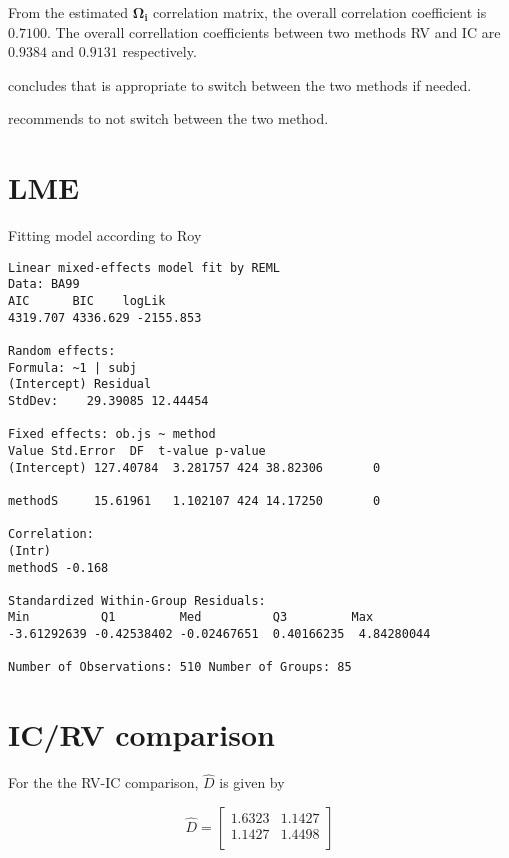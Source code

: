 From the estimated $\boldsymbol{\Omega_{i}}$ correlation matrix, the overall correlation coefficient is $0.7100$.
The overall correllation coefficients between two methods RV and IC are $0.9384$ and $0.9131$ respectively.

\citet{roy} concludes that is appropriate to switch between the two methods if needed.


\citet{haber}

\citet{roy} recommends to not switch between the two method.


\section{LME}

Fitting model according to Roy

\newpage
\begin{verbatim}
Linear mixed-effects model fit by REML
Data: BA99
AIC      BIC    logLik
4319.707 4336.629 -2155.853

Random effects:
Formula: ~1 | subj
(Intercept) Residual
StdDev:    29.39085 12.44454

Fixed effects: ob.js ~ method
Value Std.Error  DF  t-value p-value
(Intercept) 127.40784  3.281757 424 38.82306       0

methodS     15.61961   1.102107 424 14.17250       0

Correlation:
(Intr)
methodS -0.168

Standardized Within-Group Residuals:
Min          Q1         Med          Q3         Max
-3.61292639 -0.42538402 -0.02467651  0.40166235  4.84280044

Number of Observations: 510 Number of Groups: 85

\end{verbatim}

\newpage

\section{IC/RV comparison}



For the the RV-IC comparison, $\hat{D}$ is given by


\begin{equation}
\hat{D}= \left[ \begin{array}{cc}
1.6323 & 1.1427  \\
1.1427 & 1.4498 \\
\end{array} \right]
\end{equation}

